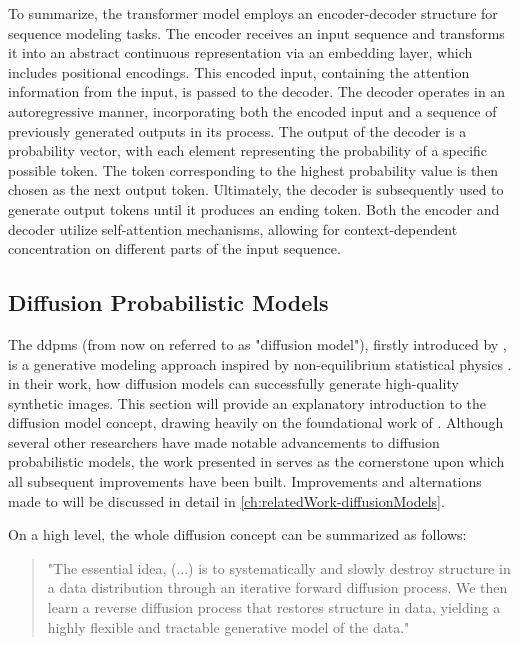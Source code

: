 To summarize, the transformer model employs an encoder-decoder structure for sequence modeling tasks. 
The encoder receives an input sequence and transforms it into an abstract continuous representation via an embedding layer, which includes positional encodings. 
This encoded input, containing the attention information from the input, is passed to the decoder. 
The decoder operates in an autoregressive manner, incorporating both the encoded input and a sequence of previously generated outputs in its process. 
The output of the decoder is a probability vector, with each element representing the probability of a specific possible token.
The token corresponding to the highest probability value is then chosen as the next output token.
Ultimately, the decoder is subsequently used to generate output tokens until it produces an ending token.
Both the encoder and decoder utilize self-attention mechanisms, allowing for context-dependent concentration on different parts of the input sequence.




\subsection{Diffusion Probabilistic Models}
\label{ch:preliminaries-diffusionProbabilisticModels}

The \Glspl{ddpm} (from now on referred to as "diffusion model"), firstly introduced by \textcite{sohl-dickstein2015DeepUnsupervisedLearning}, is a generative modeling approach inspired by non-equilibrium statistical physics \cite{sohl-dickstein2015DeepUnsupervisedLearning}.
\textcite{ho2020DenoisingDiffusionProbabilistic} in their work, how diffusion models can successfully generate high-quality synthetic images.
This section will provide an explanatory introduction to the diffusion model concept, drawing heavily on the foundational work of \cite{ho2020DenoisingDiffusionProbabilistic}.
Although several other researchers have made notable advancements to diffusion probabilistic models, the work presented in \cite{sohl-dickstein2015DeepUnsupervisedLearning, ho2020DenoisingDiffusionProbabilistic} 
serves as the cornerstone upon which all subsequent improvements have been built.
Improvements and alternations made to \cite{ho2020DenoisingDiffusionProbabilistic} will be discussed in detail in \autoref{ch:relatedWork-diffusionModels}.

On a high level, the whole diffusion concept can be summarized as follows:

\begin{quotation}
  "The essential idea, (...) is to systematically and slowly destroy structure in a data distribution through an iterative forward diffusion process. 
  We then learn a reverse diffusion process that restores structure in data, yielding a highly flexible and tractable generative model of the data." \cite[p. 1]{sohl-dickstein2015DeepUnsupervisedLearning}
\end{quotation}

